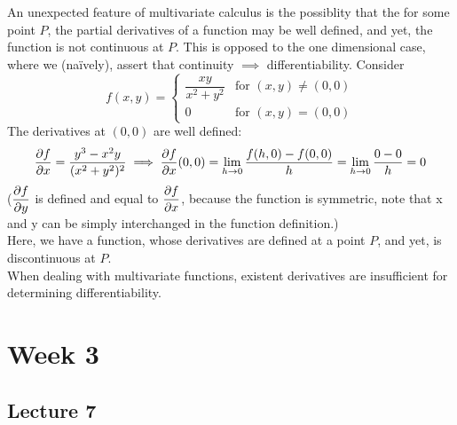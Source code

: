 \documentclass{report}
\begin{document}
\noindent An unexpected feature of multivariate calculus is the possiblity that the for some point $P$, the partial derivatives of a function may be well defined, and yet, the function is not continuous at $P$. This is opposed to the one dimensional case, where we (na\"ively), assert that continuity $\implies$ differentiability. Consider 
$$
	f(x,y) = \left\lbrace\begin{array}{ll}
		\dfrac{xy}{x^2+y^2} & \text{for } (x,y)\neq(0,0) \\
		0 & \text{for } (x,y) = (0,0)
	\end{array}\right.
$$
The derivatives at $(0,0)$ are well defined:
$$
	\frac{\partial f}{\partial x} = \frac{y^3 - x^2y}{(x^2+y^2)^2} \implies \frac{\partial f}{\partial x}(0,0) = \lim_{h\to0} \frac{f(h, 0) - f(0,0)}{h} = \lim_{h\to 0} \frac{0 - 0}{h} = 0
$$
($\displaystyle{\frac{\partial f}{\partial y}}$ is defined and equal to $\displaystyle{\frac{\partial f}{\partial x}}$, because the function is symmetric, note that x and y can be simply interchanged in the function definition.)\\
Here, we have a function, whose derivatives are defined at a point $P$, and yet, is discontinuous at $P$.\\
When dealing with multivariate functions, existent derivatives are insufficient for determining differentiability.

\chapter{Week 3}
\section{Lecture 7}
\end{document}
